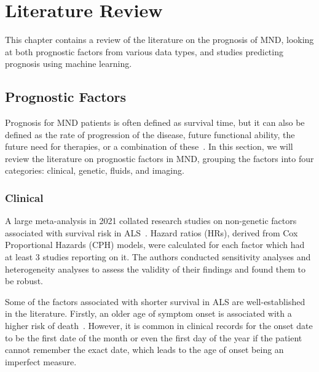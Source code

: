 \chapter{Literature Review}
\label{literature_review}

This chapter contains a review of the literature on the prognosis of MND, looking at both prognostic factors from various data types, and studies predicting prognosis using machine learning.

\section{Prognostic Factors}

Prognosis for MND patients is often defined as survival time, but it can also be defined as the rate of progression of the disease, future functional ability, the future need for therapies, or a combination of these~\cite{papaizMachineLearningSolutions2022, tavazziArtificialIntelligenceStatistical2023}.
In this section, we will review the literature on prognostic factors in MND, grouping the factors into four categories: clinical, genetic, fluids, and imaging.

\subsection{Clinical}

A large meta-analysis in 2021 collated research studies on non-genetic factors associated with survival risk in ALS~\cite{suPredictorsSurvivalPatients2021}.
Hazard ratios (HRs), derived from Cox Proportional Hazards (CPH) models, were calculated for each factor which had at least 3 studies reporting on it.
The authors conducted sensitivity analyses and heterogeneity analyses to assess the validity of their findings and found them to be robust.

Some of the factors associated with shorter survival in ALS are well-established in the literature.
Firstly, an older age of symptom onset is associated with a higher risk of death~\cite{suPredictorsSurvivalPatients2021}.
However, it is common in clinical records for the onset date to be the first date of the month or even the first day of the year if the patient cannot remember the exact date, which leads to the age of onset being an imperfect measure.

